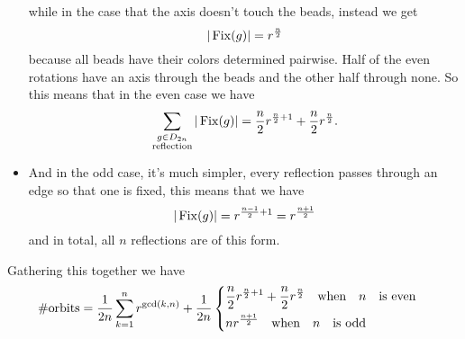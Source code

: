 \documentclass[12pt]{memoir}
\begin{document}
\begin{ptcbr}
\begin{itemize}
    while in the case that the axis doesn't touch the beads, instead we get 
    $$|\operatorname{Fix}(g)|=r^{\frac{n}{2}}$$
    because all beads have their colors determined pairwise. 
    Half of the even rotations have an axis through the beads and the other half through none. So this means that in the even case we have 
    $$\sum_{\substack{g\in D_{2n}\\\text{reflection}}}|\operatorname{Fix}(g)|=\frac{n}{2}r^{\frac{n}{2}+1}+\frac{n}{2}r^{\frac{n}{2}}.$$
    \item And in the odd case, it's much simpler, every reflection passes through an edge so that one is fixed, this means that we have 
    $$|\operatorname{Fix}(g)|=r^{\frac{n-1}{2}+1}=r^{\frac{n+1}{2}}$$
    and in total, all $n$ reflections are of this form. 
\end{itemize}
Gathering this together we have 
$$\#\text{orbits}=\frac{1}{2n}\sum_{k=1}^nr^{\gcd(k,n)}+\frac{1}{2n}\left\lbrace
\begin{aligned}
    &\frac{n}{2}r^{\frac{n}{2}+1}+\frac{n}{2}r^{\frac{n}{2}}\quad\text{when}\quad n\quad\text{is even}\quad\\
    &nr^{\frac{n+1}{2}}\quad\text{when}\quad n\quad\text{is odd}\quad
\end{aligned}
\right.$$
\end{ptcbr}
\end{document}
